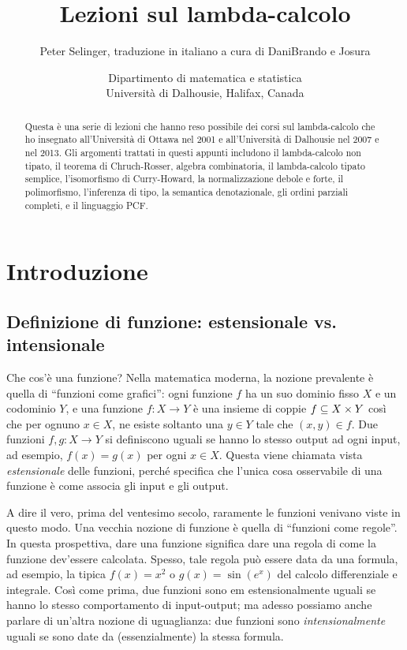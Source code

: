 \documentclass{article}
\title{Lezioni sul lambda-calcolo}
\author{Peter Selinger, traduzione in italiano a cura di DaniBrando e Josura}
\date{Dipartimento di matematica e statistica\\
  Universit\`a di Dalhousie, Halifax, Canada}
\begin{document}
\maketitle

\begin{abstract}
Questa \`e una serie di lezioni che hanno reso possibile dei corsi sul 
lambda-calcolo che ho insegnato all'Universit\`a di Ottawa nel 2001 e 
all'Universit\`a di Dalhousie nel 2007 e nel 2013. Gli argomenti trattati 
in questi appunti includono il lambda-calcolo non tipato, il teorema 
di Chruch-Rosser, algebra combinatoria, il lambda-calcolo tipato semplice, 
l'isomorfismo di Curry-Howard, la normalizzazione debole 
e forte, il polimorfismo, l'inferenza di tipo, la semantica denotazionale, 
gli ordini parziali completi, e il linguaggio PCF.
\end{abstract}

\tableofcontents

\newpage

\section{Introduzione}\label{sec-intro}

\subsection{Definizione di funzione: estensionale vs. intensionale}
\label{subsec-intro1}

Che cos'\`e una funzione? Nella matematica moderna, la nozione prevalente
\`e quella di ``funzioni come grafici'': ogni funzione $f$ ha un suo dominio
fisso $X$ e un codominio $Y$, e una funzione $f:X\to Y$ \`e una insieme di coppie
$f\subseteq X\times Y$ cos\`i che per ognuno $x\in X$, ne esiste soltanto
una $y\in Y$ tale che $(x,y)\in f$. Due funzioni $f,g:X\to Y$ si
definiscono uguali se hanno lo stesso output ad ogni input, ad esempio,
$f(x)=g(x)$ per ogni $x\in X$. Questa viene chiamata vista {\em estensionale}
delle funzioni, perché specifica che l'unica cosa osservabile 
di una funzione \`e come associa gli input e gli output.

A dire il vero, prima del ventesimo secolo, raramente le funzioni venivano
viste in questo modo. Una vecchia nozione di funzione \`e quella di ``funzioni come 
regole''. In questa prospettiva, dare una funzione significa dare una regola di
come la funzione dev'essere calcolata. Spesso, tale regola pu\`o essere data da
una formula, ad esempio, la tipica $f(x)=x^2$ o $g(x)=\sin(e^x)$
del calcolo differenziale e integrale. Cos\`i come prima, due funzioni
sono {em estensionalmente} uguali se hanno lo stesso comportamento di input-output;
ma adesso possiamo anche parlare di un'altra nozione di uguaglianza: due funzioni sono
{\em intensionalmente} uguali se sono date da (essenzialmente) la
stessa formula.
\end{document}
